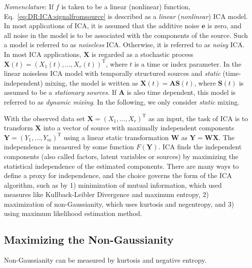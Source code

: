 \textit{Nomenclature}: If $f$ is taken to be a linear (nonlinear) function, Eq.~\ref{eq:DR:ICA:signalfromsource} is described as a \textit{linear} (\textit{nonlinear}) ICA model. In most applications of ICA, it is assumed that the additive noise $\mathbf{e}$ is zero, and all noise in the model is to be associated with the components of the source. Such a model is referred to as \textit{noiseless} ICA. Otherwise, it is referred to as \textit{noisy} ICA. In most ICA applications, $\mathbf{X}$ is regarded as a stochastic process $\mathbf{X}(t) = (X_1(t), \dots, X_r(t))^{\operatorname{T}}$, where $t$ is a time or index parameter. In the linear noiseless ICA model with temporally structured sources and \textit{static} (time-independent) mixing, the model is written as $\mathbf{X}(t)=\mathbf{A}\mathbf{S}(t)$, where $\mathbf{S}(t)$ is assumed to be a \textit{stationary sources}. If $\mathbf{A}$ is also time dependent, this model is referred to as \textit{dynamic mixing}. In the following, we only consider \textit{static} mixing.

With the observed data set $\mathbf{X}=(X_1,\dots,X_r)^{\operatorname{T}}$ as an input, the task of ICA is to transform $\mathbf{X}$ into a vector of source with maximally independent components $\mathbf{Y}=(Y_1,\dots,Y_m)^{\operatorname{T}}$ using a linear static transformation $\mathbf{W}$ as $\mathbf{Y}=\mathbf{WX}$. The independence is measured by some function $F(\mathbf{Y})$. ICA finds the independent components (also called factors, latent variables or sources) by maximizing the statistical independence of the estimated components. There are many ways to define a proxy for independence, and the choice governs the form of the ICA algorithm, such as by 1) minimization of mutual information, which used measures like Kullback-Leibler Divergence and maximum entropy, 2) maximization of non-Gaussianity, which uses kurtosis and negentropy, and 3) using maximum likelihood estimation method. 

\subsection{Maximizing the Non-Gaussianity\label{Sec:DR:ICA:MnG}}
Non-Gaussianity can be measured by kurtosis and negative entropy.
